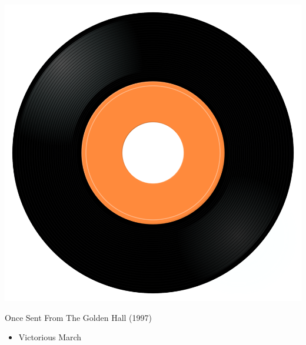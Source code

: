 \begin{minipage}[t]{0.25\textwidth}\vspace{0pt}
\captionsetup{type=figure}
\includegraphics[width=\textwidth]{Images/cover.png}
\caption*{Once Sent From The Golden Hall (1997)}
\end{minipage}
\begin{minipage}[t]{0.25\textwidth}\vspace{0pt}
\begin{itemize}[nosep,leftmargin=1em,labelwidth=*,align=left]
	\setlength{\itemsep}{0pt}
	\item Victorious March
\end{itemize}
\end{minipage}
